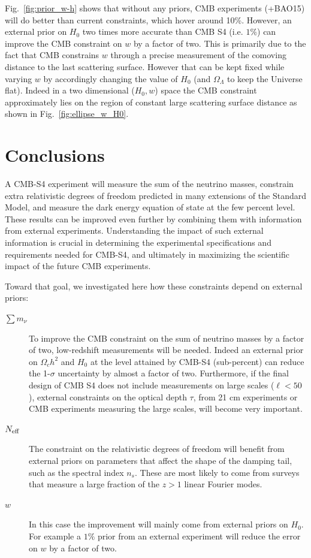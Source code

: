\documentclass[aps,prd,reprint,superscriptaddress,nofootinbib,floatfix]{revtex4-1}
\newcommand{\reffig}[1]{Fig.~\ref{fig:#1}}
\begin{document}
\reffig{prior_w-h} shows that without any priors, CMB experiments (+BAO15) will do better than current constraints, which hover around 10\%. However, an external prior on $H_{0}$ two times more accurate than CMB S4 (i.e. $1\%$) can improve the CMB constraint on $w$ by a factor of two. 
This is primarily due to the fact that CMB constrains $w$ through a precise measurement of the comoving distance to the last scattering surface. However that can be kept fixed while varying $w$ by accordingly changing the value of $H_{0}$ (and $\Omega_{\Lambda}$ to keep the Universe flat). Indeed in a two dimensional ($H_{0},w$) space the CMB constraint approximately lies on the region of constant large scattering surface distance as shown in \reffig{ellipse_w_H0}.


\section{Conclusions \label{sec:conclusions}}
A CMB-S4 experiment will measure the sum of the neutrino masses, constrain extra relativistic degrees of freedom predicted in many extensions of the Standard Model, and measure the dark energy equation of state at the few percent level. 
These results can be improved even further by combining them with information from external experiments.
Understanding the impact of such external information is crucial in determining the experimental specifications and requirements needed for CMB-S4, and ultimately in maximizing the scientific impact of the future CMB experiments. 

Toward that goal, we investigated here how these constraints depend on external priors:
\begin{description}
\item[$\sum m_\nu$] To improve the CMB constraint on the sum of neutrino masses by a factor of two, low-redshift measurements will be needed. Indeed an external prior on $\Omega_{c}h^{2}$ and $H_{0}$ at the level attained by CMB-S4 (sub-percent) can reduce the 1-$\sigma$ uncertainty by almost a factor of two.
Furthermore, if the final design of CMB S4 does not include measurements on large scales ($\ell<50$), external constraints on the optical depth $\tau$, from 21 cm experiments or CMB experiments measuring the large
scales, will become very important.
\item[$N_{\rm eff}$] The constraint on the relativistic degrees of freedom will benefit from external priors on parameters that affect the shape of the damping tail, such as the spectral index $n_s$. These are most likely to come from surveys that measure a large fraction of the $z>1$ linear Fourier modes.
\item[$w$] In this case the improvement will mainly come from external priors on $H_{0}$. For example a $1\%$ prior from an external experiment will reduce the error on $w$ by a factor of two.\end{description}
\end{document}

